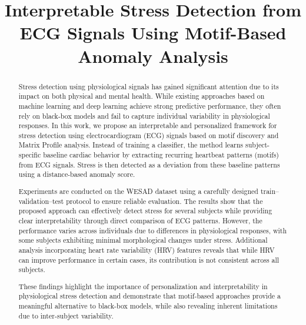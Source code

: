 \documentclass[conference,10pt]{IEEEtran}
\begin{document}
\title{Interpretable Stress Detection from ECG Signals Using Motif-Based Anomaly Analysis}

\author{
}


\maketitle

\begin{abstract}
Stress detection using physiological signals has gained significant attention due to its impact on both physical and mental health. While existing approaches based on machine learning and deep learning achieve strong predictive performance, they often rely on black-box models and fail to capture individual variability in physiological responses. In this work, we propose an interpretable and personalized framework for stress detection using electrocardiogram (ECG) signals based on motif discovery and Matrix Profile analysis. Instead of training a classifier, the method learns subject-specific baseline cardiac behavior by extracting recurring heartbeat patterns (motifs) from ECG signals. Stress is then detected as a deviation from these baseline patterns using a distance-based anomaly score.

Experiments are conducted on the WESAD dataset using a carefully designed train–validation–test protocol to ensure reliable evaluation. The results show that the proposed approach can effectively detect stress for several subjects while providing clear interpretability through direct comparison of ECG patterns. However, the performance varies across individuals due to differences in physiological responses, with some subjects exhibiting minimal morphological changes under stress. Additional analysis incorporating heart rate variability (HRV) features reveals that while HRV can improve performance in certain cases, its contribution is not consistent across all subjects.

These findings highlight the importance of personalization and interpretability in physiological stress detection and demonstrate that motif-based approaches provide a meaningful alternative to black-box models, while also revealing inherent limitations due to inter-subject variability.

\end{abstract}
\end{document}

